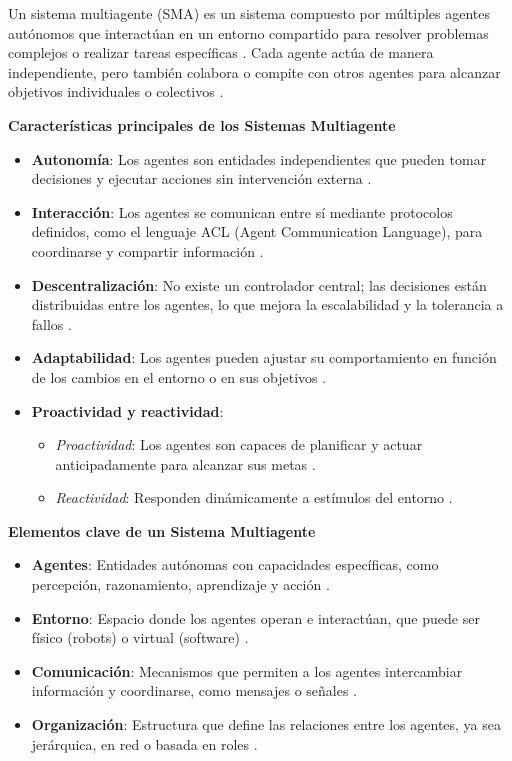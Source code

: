 Un sistema multiagente (SMA) es un sistema compuesto por múltiples agentes autónomos que interactúan en un entorno compartido para resolver problemas complejos o realizar tareas específicas \cite{wooldridge2009introduccion}. Cada agente actúa de manera independiente, pero también colabora o compite con otros agentes para alcanzar objetivos individuales o colectivos \cite{ferber1999multi}.

\textbf{Características principales de los Sistemas Multiagente}
\begin{itemize}[leftmargin=*]
	\item \textbf{Autonomía}: Los agentes son entidades independientes que pueden tomar decisiones y ejecutar acciones sin intervención externa \cite{stone2000multiagent}.
	\item \textbf{Interacción}: Los agentes se comunican entre sí mediante protocolos definidos, como el lenguaje ACL (Agent Communication Language), para coordinarse y compartir información \cite{panait2005cooperative}.
	\item \textbf{Descentralización}: No existe un controlador central; las decisiones están distribuidas entre los agentes, lo que mejora la escalabilidad y la tolerancia a fallos \cite{russell2016artificial}.
	\item \textbf{Adaptabilidad}: Los agentes pueden ajustar su comportamiento en función de los cambios en el entorno o en sus objetivos \cite{stone2000multiagent}.
	\item \textbf{Proactividad y reactividad}:
	\begin{itemize}
		\item \textit{Proactividad}: Los agentes son capaces de planificar y actuar anticipadamente para alcanzar sus metas \cite{ferber1999multi}.
		\item \textit{Reactividad}: Responden dinámicamente a estímulos del entorno \cite{russell2016artificial}.
	\end{itemize}
\end{itemize}

\textbf{Elementos clave de un Sistema Multiagente}
\begin{itemize}[leftmargin=*]
	\item \textbf{Agentes}: Entidades autónomas con capacidades específicas, como percepción, razonamiento, aprendizaje y acción \cite{wooldridge2009introduccion}.
	\item \textbf{Entorno}: Espacio donde los agentes operan e interactúan, que puede ser físico (robots) o virtual (software) \cite{stone2000multiagent}.
	\item \textbf{Comunicación}: Mecanismos que permiten a los agentes intercambiar información y coordinarse, como mensajes o señales \cite{panait2005cooperative}.
	\item \textbf{Organización}: Estructura que define las relaciones entre los agentes, ya sea jerárquica, en red o basada en roles \cite{russell2016artificial}.
\end{itemize}

